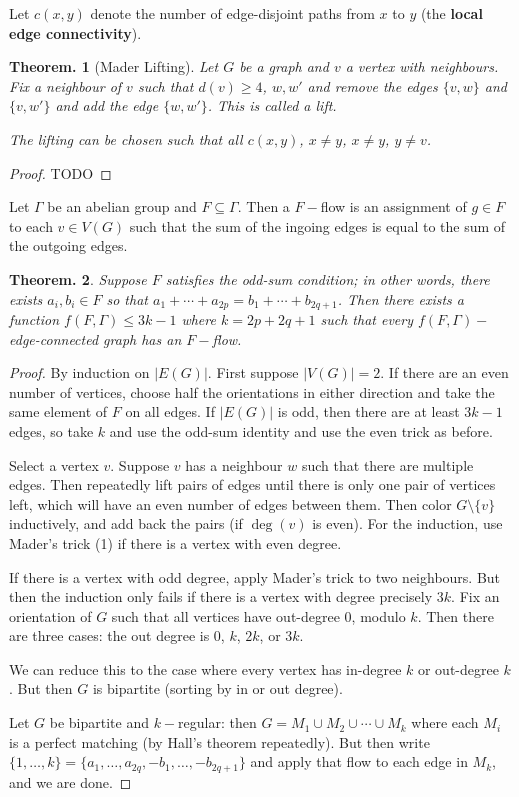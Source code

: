\documentclass[11pt, a4paper]{memoir}
\theoremstyle{change}
\newtheorem{theorem}{Theorem.}[section]
\theoremstyle{plain}
\theoremstyle{nonumberplain}
\newtheorem{proof}{Proof}
\numberwithin{equation}{section}
\begin{document}
Let $c(x,y)$ denote the number of edge-disjoint paths from $x$ to $y$ (the \textbf{local edge connectivity}).
\begin{theorem}[Mader Lifting]
    Let $G$ be a graph and $v$ a vertex with neighbours.
    Fix a neighbour of $v$ such that $d(v)\geq 4$, $w,w'$ and remove the edges $\{v,w\}$ and $\{v,w'\}$ and add the edge $\{w,w'\}$.
    This is called a lift.

    The lifting can be chosen such that all $c(x,y)$, $x\neq y$, $x\neq y$, $y\neq v$.
\end{theorem}
\begin{proof}
    TODO
\end{proof}
Let $\Gamma$ be an abelian group and $F\subseteq\Gamma$.
Then a $F-$flow is an assignment of $g\in F$ to each $v\in V(G)$ such that the sum of the ingoing edges is equal to the sum of the outgoing edges.
\begin{theorem}
    Suppose $F$ satisfies the odd-sum condition; in other words, there exists $a_i,b_i\in F$ so that $a_1+\cdots+a_{2p}=b_1+\cdots+b_{2q+1}$.
    Then there exists a function $f(F,\Gamma)\leq 3k-1$ where $k=2p+2q+1$ such that every $f(F,\Gamma)-$edge-connected graph has an $F-$flow.
\end{theorem}
\begin{proof}
    By induction on $|E(G)|$.
    First suppose $|V(G)|=2$.
    If there are an even number of vertices, choose half the orientations in either direction and take the same element of $F$ on all edges.
    If $|E(G)|$ is odd, then there are at least $3k-1$ edges, so take $k$ and use the odd-sum identity and use the even trick as before.

    Select a vertex $v$.
    Suppose $v$ has a neighbour $w$ such that there are multiple edges.
    Then repeatedly lift pairs of edges until there is only one pair of vertices left, which will have an even number of edges between them.
    Then color $G\setminus\{v\}$ inductively, and add back the pairs (if $\deg(v)$ is even).
    For the induction, use Mader's trick (1) if there is a vertex with even degree.

    If there is a vertex with odd degree, apply Mader's trick to two neighbours.
    But then the induction only fails if there is a vertex with degree precisely $3k$.
    Fix an orientation of $G$ such that all vertices have out-degree 0, modulo $k$.
    Then there are three cases: the out degree is $0$, $k$, $2k$, or $3k$.

    We can reduce this to the case where every vertex has in-degree $k$ or out-degree $k$.
    But then $G$ is bipartite (sorting by in or out degree).

    Let $G$ be bipartite and $k-$regular: then $G=M_1\cup M_2\cup\cdots\cup M_k$ where each $M_i$ is a perfect matching (by Hall's theorem repeatedly).
    But then write $\{1,\ldots,k\}=\{a_1,\ldots,a_{2q},-b_1,\ldots,-b_{2q+1}\}$ and apply that flow to each edge in $M_k$, and we are done.
\end{proof}
\end{document}
